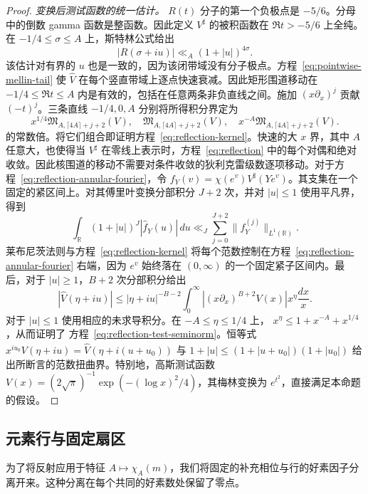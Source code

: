 \documentclass[11pt,a4paper]{article}
\numberwithin{equation}{section}
\numberwithin{figure}{section}
\theoremstyle{definition}
\theoremstyle{remark}
\begin{document}
\begin{proof}
\emph{变换后测试函数的统一估计。}
$R(t)$ 分子的第一个负极点是 $-5/6$。分母中的倒数 gamma 函数是整函数。因此定义 $V^\sharp$ 的被积函数在 $\Re t>-5/6$ 上全纯。在 $-1/4\le\sigma\le A$ 上，斯特林公式给出
\[
 |R(\sigma+iu)|\ll_A(1+|u|)^{4\sigma}.
\]
该估计对有界的 $u$ 也是一致的，因为该闭带域没有分子极点。方程~\eqref{eq:pointwise-mellin-tail} 使 $\widehat V$ 在每个竖直带域上逐点快速衰减。因此矩形围道移动在 $-1/4\le\Re t\le A$ 内是有效的，包括在任意两条非负直线之间。施加 $(x\partial_x)^j$ 贡献 $(-t)^j$。三条直线 $-1/4,0,A$ 分别将所得积分界定为
\[
 x^{1/4}\mathfrak M_{A,\lceil4A\rceil+j+2}(V),\quad
 \mathfrak M_{A,\lceil4A\rceil+j+2}(V),\quad
 x^{-A}\mathfrak M_{A,\lceil4A\rceil+j+2}(V).
\]
的常数倍。将它们组合即证明方程~\eqref{eq:reflection-kernel}。快速的大 $x$ 界，其中 $A$ 任意大，也使得当 $V^\sharp$ 在零线上表示时，方程~\eqref{eq:reflection} 中的每个对偶和绝对收敛。因此核围道的移动不需要对条件收敛的狄利克雷级数逐项移动。对于方程~\eqref{eq:reflection-annular-fourier}，令
$f_Y(v)=\chi(e^v)V^\sharp(Ye^v)$。其支集在一个固定的紧区间上。对其傅里叶变换分部积分 $J+2$ 次，并对 $|u|\le1$ 使用平凡界，得到
\[
 \int_{\mathbb R}(1+|u|)^J|\widehat f_Y(u)|\,du
 \ll_J\sum_{j=0}^{J+2}\|f_Y^{(j)}\|_{L^1(\mathbb R)}.
\]
莱布尼茨法则与方程~\eqref{eq:reflection-kernel} 将每个范数控制在方程~\eqref{eq:reflection-annular-fourier} 右端，因为 $e^v$ 始终落在 $(0,\infty)$ 的一个固定紧子区间内。最后，对于 $|u|\ge1$，$B+2$ 次分部积分给出
\[
 |\widehat V(\eta+iu)|
 \le |\eta+iu|^{-B-2}
       \int_0^\infty|(x\partial_x)^{B+2}V(x)|x^\eta\frac{dx}{x}.
\]
对于 $|u|\le1$ 使用相应的未求导积分。在 $-A\le\eta\le1/4$ 上，
$x^\eta\le1+x^{-A}+x^{1/4}$，从而证明了
方程~\eqref{eq:reflection-test-seminorm}。恒等式
$\widehat{x^{iu_0}V}(\eta+iu)=\widehat V(\eta+i(u+u_0))$
与 $1+|u|\le(1+|u+u_0|)(1+|u_0|)$ 给出所断言的范数扭曲界。特别地，高斯测试函数
$V(x)=(2\sqrt\pi)^{-1}\exp(- (\log x)^2/4)$，其梅林变换为
$e^{t^2}$，直接满足本命题的假设。
\end{proof}

\subsection{元素行与固定扇区}

为了将反射应用于特征 $A\mapsto\chi_A(m)$，我们将固定的补充相位与行的好素因子分离开来。这种分离在每个共同的好素数处保留了零点。
\end{document}

